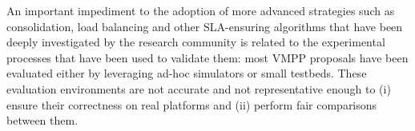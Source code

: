 An important impediment to the adoption of more advanced strategies
such as consolidation, load balancing and other SLA-ensuring
algorithms that have been deeply investigated by the research community
\cite{feller:ccgrid12, Hermenier:2009:ECM:1508293.1508300, 5715067,
  quesnel:cpe2012, 5328077, 5935254} is related to the experimental
processes that have been used to validate them: most VMPP proposals have
been evaluated either by leveraging ad-hoc simulators or small
testbeds. These evaluation environments are not accurate and not
representative enough to (i) ensure their correctness on real
platforms and (ii) perform fair comparisons between them.

